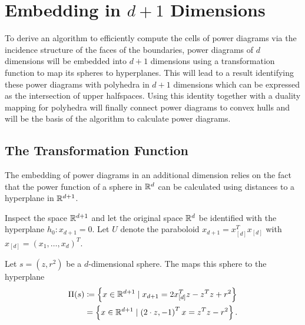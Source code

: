 \section{Embedding in \texorpdfstring{$d+1$}{d+1} Dimensions}
\label{sec:embedding_in_d_1_dimensions}
To derive an algorithm to efficiently compute the cells of power diagrams via the incidence structure of the faces of the boundaries, power diagrams of $d$ dimensions will be embedded into $d+1$ dimensions using a transformation function to map its spheres to hyperplanes.
This will lead to a result identifying these power diagrams with polyhedra in $d+1$ dimensions which can be expressed as the intersection of upper halfspaces.
Using this identity together with a duality mapping for polyhedra will finally connect power diagrams to convex hulls and will be the basis of the algorithm to calculate power diagrams.

\subsection{The Transformation Function}
\label{sub:the_transform}
The embedding of power diagrams in an additional dimension relies on the fact that the power function of a sphere in $\mathbb{R}^d$ can be calculated using distances to a hyperplane in $\mathbb{R}^{d+1}$.

Inspect the space $\mathbb{R}^{d+1}$ and let the original space $\mathbb{R}^d$ be identified with the hyperplane $h_0: x_{d+1} = 0$.
Let $U$ denote the paraboloid $x_{d+1} = x_{[d]}^Tx_{[d]}$ with $x_{[d]} = \left( x_1, \dots, x_d \right)^T$.
\begin{definition}
    Let $s = (z, r^2)$ be a $d$-dimensional sphere.
    The  maps this sphere to the hyperplane
    \begin{align}
        \Pi(s) &\coloneqq \left\{ x \in \mathbb{R}^{d+1} \mid x_{d+1} = 2x_{[d]}^Tz - z^Tz + r^2 \right\}\\
    &= \left\{ x \in \mathbb{R}^{d+1} \mid \left( 2 \cdot z, -1 \right)^T x = z^Tz - r^2 \right\}.
    \end{align}
\end{definition}

